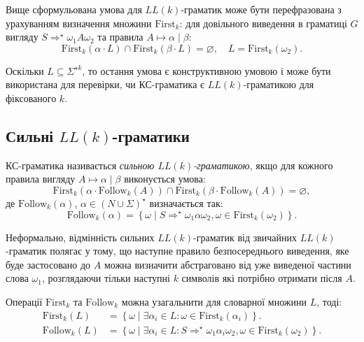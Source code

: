 Вище сформульована умова для $LL(k)$-граматик може бути перефразована з урахуванням визначення множини $\text{First}_k$: для довільного виведення в граматиці $G$ вигляду $S \Rightarrow^\star \omega_1 A \omega_2$ та правила $A \mapsto \alpha \mid \beta$:
\begin{equation}
	\text{First}_k(\alpha \cdot L) \cap \text{First}_k (\beta \cdot L) = \varnothing, \quad L = \text{First}_k(\omega_2).
\end{equation}

Оскільки $L \subseteq \Sigma^{\star k}$, то остання умова є конструктивною умовою і може бути використана для перевірки, чи КС-граматика є $LL(k)$-граматикою для фіксованого $k$.

\subsection{Сильні \texorpdfstring{$LL(k)$}{LLk}-граматики}

КС-граматика називається \textit{сильною $LL(k)$-граматикою}, якщо для кожного правила вигляду $A \mapsto \alpha \mid \beta$ виконується умова:
\begin{equation}
	\text{First}_k (\alpha \cdot \text{Follow}_k (A)) \cap \text{First}_k (\beta \cdot \text{Follow}_k (A)) = \varnothing,
\end{equation}
де $\text{Follow}_k(\alpha)$, $\alpha \in (N \cup \Sigma)^\star$ визначається так:
\begin{equation}
	\text{Follow}_k (\alpha) = \left\{ \omega \mid S \Rightarrow^\star \omega_1 \alpha \omega_2, \omega \in \text{First}_k(\omega_2) \right\}.
\end{equation}

Неформально, відмінність сильних $LL(k)$-граматик від звичайних \allowbreak $LL(k)$-гра\-ма\-тик полягає у тому, що наступне правило безпосереднього виведення, яке буде застосовано до $A$ можна визначити абстраговано від уже виведеної частини слова $\omega_1$, розглядаючи тільки наступні $k$ символів які потрібно отримати після $A$. \medskip

Операції $\text{First}_k$ та $\text{Follow}_k$ можна узагальнити для словарної множини $L$, тоді:
\begin{align}
	\text{First}_k (L) &= \left\{ \omega \mid \exists \alpha_i \in L: \omega \in \text{First}_k (\alpha_i) \right\}. \\
	\text{Follow}_k (L) &= \left\{ \omega \mid \exists \alpha_i \in L: S \Rightarrow^\star \omega_1 \alpha_i \omega_2, \omega \in \text{First}_k (\omega_2) \right\}.
\end{align}

